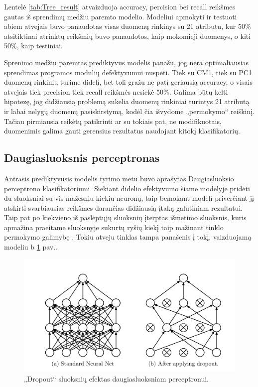 \documentclass{VUMIFPSbakalaurinis}
\begin{document}
Lentelė \ref{tab:Tree_result} atvaizduoja accuracy, percision bei recall reikšmes gautas iš sprendimų medžiu paremto modelio. Modeliui apmokyti ir testuoti abiem atvejais buvo panaudotas visas duomenų rinkinys su 21 atributu, kur 50\% atsitiktinai atrinktų reikšmių buvo panaudotos, kaip mokomieji duomenys, o kiti 50\%, kaip testiniai.

Sprenimo medžiu paremtas prediktyvus modelis panašu, jog nėra optimaliausias sprendimas programos modulių defektyvumui nuspėti. Tiek su CM1, tiek su PC1 duomenų rinkiniu turime didelį, bet toli gražu ne patį geriausią accuracy, o visais atvejais tiek precision tiek recall reikšmės nesiekė 50\%. Galima būtų kelti hipotezę, jog didžiausią problemą sukelia duomenų rinkiniai turintys 21 atributą ir labai nelygų duomenų pasiskirstymą, kodėl čia išvydome „permokymo“ reiškinį. Tačiau pirmiausia reikėtų patikrinti ar su tokiais pat, ne modifikuotais, duomenimis galima gauti gerensius rezultatus naudojant kitokį klasifikatorių.

\subsection{Daugiasluoksnis perceptronas}
Antrasis prediktyvusis modelis tyrimo metu buvo aprašytas Daugiasluoksio perceptrono klasifikatoriumi. Siekiant didelio efektyvumo šiame modelyje pridėti du sluoksniai su vis mažesniu kiekiu neuronų, taip bemokant modelį priverčiant jį atskirti svarbiausias reikšmes darančias didžiausią įtaką galutiniam rezultatui. Taip pat po kiekvieno iš paslėptųjų sluoksnių įterptas išmetimo sluoksnis, kuris apmažina praeitame sluoksnyje sukurtų ryšių kiekį taip mažinant tinklo permokymo galimybę \cite{JMLR:v15:srivastava14a}. Tokiu atveju tinklas tampa panašenis į tokį, vaizduojamą modeliu b \ref{img:dropout} pav..

\begin{figure}[H]
    \centering
    \includegraphics[scale=0.5]{img/dropout}
    \caption{„Dropout“ sluoksnių efektas daugiasluoksniam perceptronui.}
    \label{img:dropout}
\end{figure}
\end{document}
